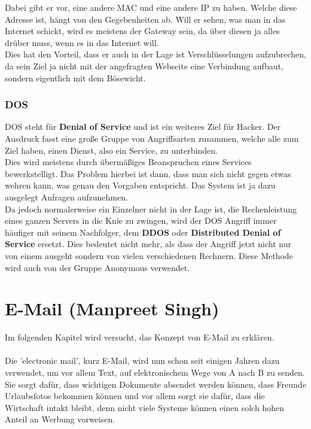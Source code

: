\documentclass[12pt,a4paper]{report}
\begin{document}
\begin{onehalfspace}
Dabei gibt er vor, eine andere MAC und eine andere IP zu haben. Welche diese Adresse ist, hängt von den Gegebenheiten ab. Will er sehen, was man in das Internet schickt, wird es meistens der Gateway sein, da über diesen ja alles drüber muss, wenn es in das Internet will.\\
Dies hat den Vorteil, dass er auch in der Lage ist Verschlüsselungen aufzubrechen, da sein Ziel ja nicht mit der angefragten Webseite eine Verbindung aufbaut, sondern eigentlich mit dem Bösewicht. 

\subsection{DOS}
DOS steht für \textbf{Denial of Service} und ist ein weiteres Ziel für Hacker. Der Ausdruck fasst eine große Gruppe von Angriffsarten zusammen, welche alle zum Ziel haben, einen Dienst, also ein Service, zu unterbinden.\\
Dies wird meistens durch übermäßiges Beanspruchen eines Services bewerkstelligt. Das Problem hierbei ist dann, dass man sich nicht gegen etwas wehren kann, was genau den Vorgaben entspricht. Das System ist ja dazu ausgelegt Anfragen aufzunehmen.\\

Da jedoch normalerweise ein Einzelner nicht in der Lage ist, die Rechenleistung eines ganzen Servers in die Knie zu zwingen, wird der DOS Angriff immer häufiger mit seinem Nachfolger, dem \textbf{DDOS} oder \textbf{Distributed Denial of Service} ersetzt. Dies bedeutet nicht mehr, als dass der Angriff jetzt nicht nur von einem ausgeht sondern von vielen verschiedenen Rechnern. Diese Methode wird auch von der Gruppe Anonymous verwendet.

\chapter{E-Mail (Manpreet Singh)}
Im folgenden Kapitel wird versucht, das Konzept von E-Mail zu erklären.\\\\
Die 'electronic mail', kurz E-Mail, wird nun schon seit einigen Jahren dazu verwendet, um vor allem Text, auf elektronischem Wege von A nach B zu senden. Sie sorgt dafür, dass wichtigen Dokumente absendet werden können, dass Freunde Urlaubsfotos bekommen können und vor allem sorgt sie dafür, dass die Wirtschaft intakt bleibt, denn nicht viele Systeme können einen solch hohen Anteil an Werbung vorweisen. 

\end{onehalfspace}
\end{document}
